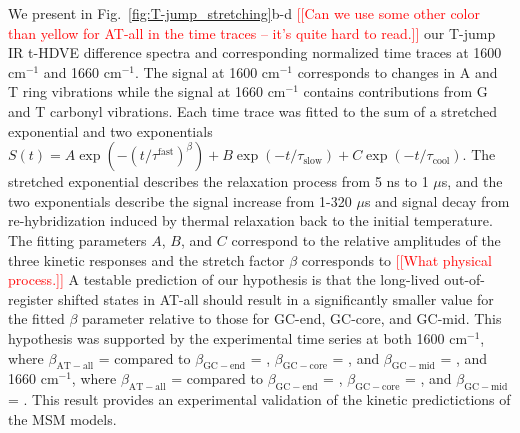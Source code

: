 \documentclass[journal=jpcbfk,manuscript=article]{achemso}
\newcommand*{\rood}[1]{{\color{red}{#1}}}
\newcommand*{\noter}[1]{\textcolor{red}{[[#1]]}}		%
\begin{document}
We present in Fig.~\ref{fig:T-jump_stretching}b-d \noter{Can we use some other color than yellow for AT-all in the time traces -- it's quite hard to read.} our T-jump IR t-HDVE difference spectra and corresponding normalized time traces at 1600 cm$^{-1}$ and 1660 cm$^{-1}$. The signal at 1600 cm$^{-1}$ corresponds to changes in A and T ring vibrations while the signal at 1660 cm$^{-1}$ contains contributions from G and T carbonyl vibrations. Each time trace was fitted to the sum of a stretched exponential and two exponentials $S(t) = A\exp{(-(t/\tau^{\mathrm{fast}})^{\beta})} + B\exp{(-t/\tau_{\mathrm{slow}})}+C\exp{(-t/\tau_{\mathrm{cool}})}$. The stretched exponential describes the relaxation process from 5 ns to 1 $\mu$s, and the two exponentials describe the signal increase from 1-320 $\mu$s and signal decay from re-hybridization induced by thermal relaxation back to the initial temperature. The fitting parameters $A$, $B$, and $C$ correspond to the relative amplitudes of the three kinetic responses and the stretch factor $\beta$ corresponds to \noter{What physical process.} A testable prediction of our hypothesis is that the long-lived out-of-register shifted states in AT-all should result in a significantly smaller value for the fitted $\beta$ parameter relative to those for GC-end, GC-core, and GC-mid. This hypothesis was supported by the experimental time series at both 1600 cm$^{-1}$, where $\beta_\mathrm{AT-all}$ = \rood{XX} compared to $\beta_\mathrm{GC-end}$ = \rood{XX}, $\beta_\mathrm{GC-core}$ = \rood{XX}, and $\beta_\mathrm{GC-mid}$ = \rood{XX}, and 1660 cm$^{-1}$, where $\beta_\mathrm{AT-all}$ = \rood{XX} compared to $\beta_\mathrm{GC-end}$ = \rood{XX}, $\beta_\mathrm{GC-core}$ = \rood{XX}, and $\beta_\mathrm{GC-mid}$ = \rood{XX}. This result provides an experimental validation of the kinetic predictictions of the MSM models. 
\end{document}
